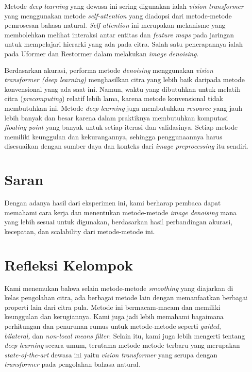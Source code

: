 \documentclass[11pt, a4paper, final]{report}
\begin{document}
Metode \textit{deep learning} yang dewasa ini sering digunakan ialah \textit{vision transformer} yang menggunakan metode \textit{self-attention} yang diadopsi dari metode-metode pemrosesan bahasa natural. \textit{Self-attention} ini merupakan mekanisme yang membolehkan melihat interaksi antar entitas dan \textit{feature maps} pada jaringan untuk mempelajari hierarki yang ada pada citra. Salah satu penerapannya ialah pada Uformer dan Restormer dalam melakukan \textit{image denoising}.

Berdasarkan akurasi, performa metode \textit{denoising} menggunakan \textit{vision transformer (deep learning)} menghasilkan citra yang lebih baik daripada metode konvensional yang ada saat ini. Namun, waktu yang dibutuhkan untuk melatih citra (\textit{precomputing}) relatif lebih lama, karena metode konvensional tidak membutuhkan ini. Metode \textit{deep learning} juga membutuhkan \textit{resource} yang jauh lebih banyak dan besar karena dalam praktiknya membutuhkan komputasi \textit{floating point} yang banyak untuk setiap iterasi dan validasinya. Setiap metode memiliki keunggulan dan kekurangannya, sehingga penggunaannya harus disesuaikan dengan sumber daya dan konteks dari \textit{image preprocessing} itu sendiri.

\section{Saran}

Dengan adanya hasil dari eksperimen ini, kami berharap pembaca dapat memahami cara kerja dan menentukan metode-metode \textit{image denoising} mana yang lebih sesuai untuk digunakan, berdasarkan hasil perbandingan akurasi, kecepatan, dan scalability dari metode-metode ini.

\section {Refleksi Kelompok}

Kami menemukan bahwa selain metode-metode \textit{smoothing} yang diajarkan di kelas pengolahan citra, ada berbagai metode lain dengan memanfaatkan berbagai properti lain dari citra pula. Metode ini bermacam-macam dan memiliki keunggulan dan kerugiannya. Kami juga jadi lebih memahami bagaimana perhitungan dan penurunan rumus untuk metode-metode seperti \textit{guided, bilateral,} dan \textit{non-local means filter}. Selain itu, kami juga lebih mengerti tentang \textit{deep learning} secara umum, terutama metode-metode terbaru yang merupakan \textit{state-of-the-art} dewasa ini yaitu \textit{vision transformer} yang serupa dengan \textit{transformer} pada pengolahan bahasa natural.

\newpage
\nocite{*}



\end{document}
